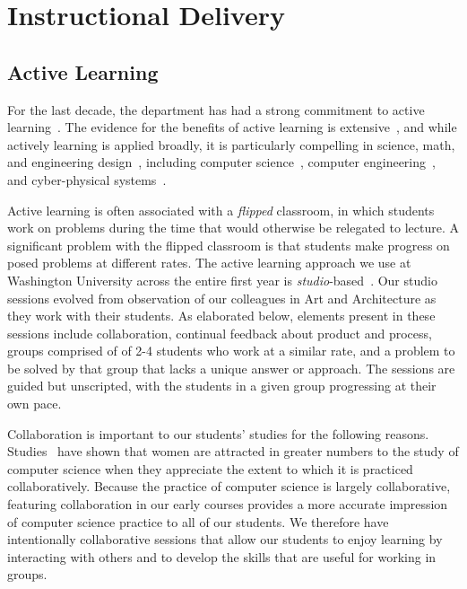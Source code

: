 \section{Instructional Delivery}
\label{sec:delivery}

\subsection{Active Learning}

For the last decade, the department has had a strong commitment to
active learning~\cite{scbggg10,sgcggt10}.
The evidence for the benefits of active learning is
extensive~\cite{jjs98,lst99,Prince04,rss97},
and while actively learning is applied broadly, it is particularly
compelling in science, math, and engineering
design~\cite{Freeman14,lst99,Hake98,Byerley01,kb06}, including computer
science~\cite{McConnell96,tlb01,skltc10,ag13},
computer engineering~\cite{hmdpa04,sr02},
and cyber-physical systems~\cite{me14,mmy16}.

Active learning is often associated with a \emph{flipped} classroom, in
which students work on problems during the time that would otherwise be
relegated to lecture.  A significant problem with the flipped classroom is
that students make progress on posed problems at different
rates.
The active learning approach we use at Washington University across the entire
first year is \emph{studio}-based~\cite{hnc08}.
Our studio sessions evolved from observation of our colleagues in
Art and Architecture as they work with their students.  As elaborated below,
elements present in
these sessions include collaboration, continual feedback about product
and process, groups comprised of of 2-4 students who work at a similar rate, 
and a problem to be solved by that group that lacks a unique
answer or approach.  The sessions are guided but unscripted, with the
students in a given group progressing at their own pace.

Collaboration is important to our students' studies for the following reasons.
Studies~\cite{Krause:2012:EFL:2157136.2157192} have shown that women are
attracted in greater numbers to the study of computer science when they
appreciate the extent to which it is practiced collaboratively.  Because
the practice of computer science is largely collaborative, featuring collaboration
in our early courses provides a more accurate impression of computer science
practice to all of our students.  We therefore have intentionally collaborative
sessions that allow our students to enjoy learning by interacting with others
and to develop the skills that are useful for working in groups.


